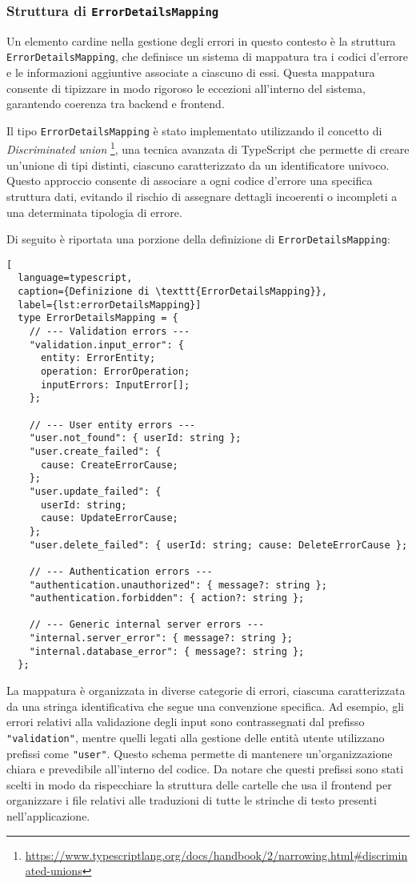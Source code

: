 \subsubsection{Struttura di \texttt{ErrorDetailsMapping}}
Un elemento cardine nella gestione degli errori in questo contesto è la struttura \texttt{ErrorDetailsMapping}, che definisce un sistema di mappatura tra i codici d'errore e le informazioni aggiuntive associate a ciascuno di essi. Questa mappatura consente di tipizzare in modo rigoroso le eccezioni all'interno del sistema, garantendo coerenza tra backend e frontend.

Il tipo \texttt{ErrorDetailsMapping} è stato implementato utilizzando il concetto di \textit{Discriminated union} \footnote{\url{https://www.typescriptlang.org/docs/handbook/2/narrowing.html\#discriminated-unions}}, una tecnica avanzata di TypeScript che permette di creare un'unione di tipi distinti, ciascuno caratterizzato da un identificatore univoco. Questo approccio consente di associare a ogni codice d'errore una specifica struttura dati, evitando il rischio di assegnare dettagli incoerenti o incompleti a una determinata tipologia di errore.

Di seguito è riportata una porzione della definizione di \texttt{ErrorDetailsMapping}:

\begin{lstlisting}[
  language=typescript,
  caption={Definizione di \texttt{ErrorDetailsMapping}},
  label={lst:errorDetailsMapping}]
  type ErrorDetailsMapping = {
    // --- Validation errors ---
    "validation.input_error": {
      entity: ErrorEntity;
      operation: ErrorOperation;
      inputErrors: InputError[];
    };

    // --- User entity errors ---
    "user.not_found": { userId: string };
    "user.create_failed": {
      cause: CreateErrorCause;
    };
    "user.update_failed": {
      userId: string;
      cause: UpdateErrorCause;
    };
    "user.delete_failed": { userId: string; cause: DeleteErrorCause };

    // --- Authentication errors ---
    "authentication.unauthorized": { message?: string };
    "authentication.forbidden": { action?: string };

    // --- Generic internal server errors ---
    "internal.server_error": { message?: string };
    "internal.database_error": { message?: string };
  };
\end{lstlisting}

La mappatura è organizzata in diverse categorie di errori, ciascuna caratterizzata da una stringa identificativa che segue una convenzione specifica. Ad esempio, gli errori relativi alla validazione degli input sono contrassegnati dal prefisso \texttt{"validation"}, mentre quelli legati alla gestione delle entità utente utilizzano prefissi come \texttt{"user"}. Questo schema permette di mantenere un'organizzazione chiara e prevedibile all'interno del codice. Da notare che questi prefissi sono stati scelti in modo da rispecchiare la struttura delle cartelle che usa il frontend per organizzare i file relativi alle traduzioni di tutte le strinche di testo presenti nell'applicazione.

